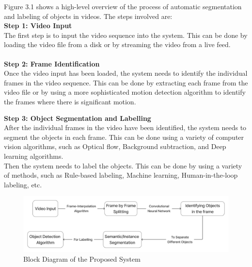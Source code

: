 \noindent
Figure 3.1 shows a high-level overview of the process of automatic segmentation and labeling of objects in videos. The steps involved are:
\\

\textbf{Step 1: Video Input}\\
The first step is to input the video sequence into the system. This can be done by loading the video file from a disk or by streaming the video from a live feed.\\
\\
\textbf{Step 2: Frame Identification}\\
Once the video input has been loaded, the system needs to identify the individual frames in the video sequence. This can be done by extracting each frame from the video file or by using a more sophisticated motion detection algorithm to identify the frames where there is significant motion.

\noindent
\textbf{Step 3: Object Segmentation and Labelling}\\
After the individual frames in the video have been identified, the system needs to segment the objects in each frame. This can be done using a variety of computer vision algorithms, such as Optical flow, Background subtraction, and Deep learning algorithms.\\
Then the system needs to label the objects. This can be done by using a variety of methods, such as Rule-based labeling, Machine learning, Human-in-the-loop labeling, etc.

\begin{figure}[h]
    \centering
    \includegraphics[width=\textwidth]{Images/Block_Diagram.png}
    \caption{Block Diagram of the Proposed System}
\end{figure}

